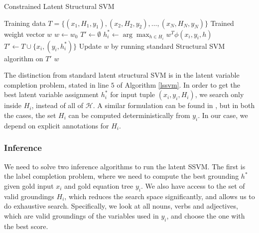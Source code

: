       \begin{algorithm}
       \caption{Constrained Latent Structural SVM}
       \label{lssvm}
       \begin{algorithmic}[1]
         \REQUIRE Training data $T = \{(x_1, H_1, y_1), (x_2, H_2, y_2),
         \ldots, (x_N, H_N, y_N)\}$ 
         \ENSURE Trained weight vector $w$
         \STATE $w \leftarrow w_0$
         \REPEAT 
           \STATE $T' \leftarrow \emptyset$
             \STATE $h_i^* \leftarrow \arg\max_{h \in H_i} w^T\phi(x_i, y_i, h)$
             \STATE $T' \leftarrow T \cup \{x_i, (y_i, h_i^*)\}$  
           \ENDFOR
           \STATE Update $w$ by running standard Structural SVM algorithm
           on $T'$
         \RETURN $w$
       \end{algorithmic}
      \end{algorithm}


      

      The distinction from standard latent structural SVM is in the
      latent variable completion problem, stated in line $5$ of Algorithm
      \ref{lssvm}. In order to get the best latent variable assignment
      $h_i^*$ for input tuple $(x_i, y_i, H_i)$, we search only inside
      $H_i$, instead of all of $\mathcal{H}$. A similar
      formulation can be found in
      \cite{ZettlemoyerCo07,BjorkelundKu14}, but in both the cases,
      the set $H_i$ can be computed deterministically from $y_i$. In
      our case, we depend on explicit annotations for $H_i$.

    \subsubsection{Inference}
      We need to solve two inference algorithms to run the latent
      SSVM. The first is the label completion problem, where we need
      to compute the best grounding $h^*$ given gold input $x_i$ and
      gold equation tree $y_i$. We also have access to the set of
      valid groundings $H_i$, which reduces the search space
      significantly, and allows us to do exhaustive
      search. Specifically, we look at all nouns, verbs and
      adjectives, which are valid groundings of the variables used in
      $y_i$, and choose the one with the best score.

